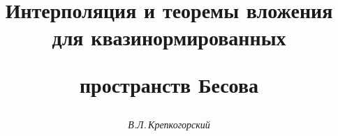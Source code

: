 

 


%


 


\newcommand{\supp}{\operatorname{supp}} 


\newcommand{\tts}[1]{}


\renewcommand{\baselinestretch}{1.05}


 




\setcounter{page}{23} 












 


\author{\it В.Л.\,Крепкогорский} 




\title{Интерполяция и теоремы вложения для квазинормированных  


пространств Бесова} 


 


\date{} 




\pagestyle{plain} %


 




\maketitle 


